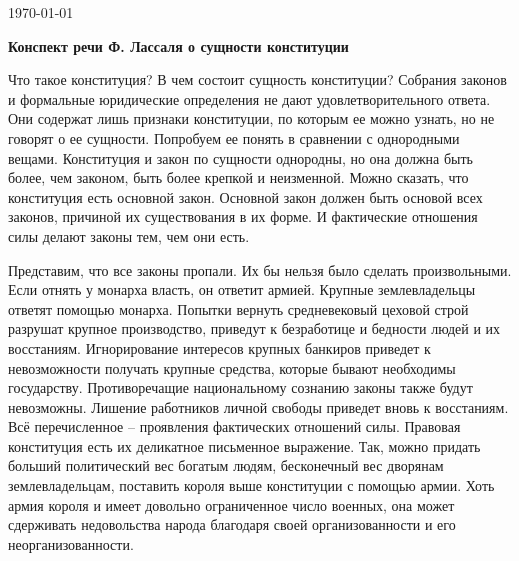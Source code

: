 \documentclass[a4paper, 12pt]{article}
\begin{document}
 \hfill {\today}

\begin{center}
\bf Конспект речи Ф. Лассаля о сущности конституции 
\end{center}

\def\paste{
Здесь текст, который должен занимать одну двадцатую часть страницы. Ровно столько я должен написать о каждой странице речи. Или чуть больше. 
}
Что такое конституция? В чем состоит сущность конституции? Собрания законов и формальные юридические определения не дают удовлетворительного ответа. 
Они содержат лишь признаки конституции, по которым ее можно узнать, но не говорят о ее сущности. Попробуем ее понять в сравнении с однородными вещами. 
Конституция и закон по сущности однородны, но она должна быть более, чем законом, быть более крепкой и неизменной. Можно сказать, что конституция есть основной закон. 
Основной закон должен быть основой всех законов, причиной их существования в их форме. И фактические отношения силы делают законы тем, чем они есть.

Представим, что все законы пропали. Их бы нельзя было сделать произвольными. Если отнять у монарха власть, он ответит армией. Крупные землевладельцы ответят помощью монарха. 
Попытки вернуть средневековый цеховой строй разрушат крупное производство, приведут к безработице и бедности людей и их восстаниям. 
Игнорирование интересов крупных банкиров приведет к невозможности получать крупные средства, которые бывают необходимы государству. Противоречащие национальному сознанию законы также будут невозможны. 
Лишение работников личной свободы приведет вновь к восстаниям. Всё перечисленное -- проявления фактических отношений силы. Правовая конституция есть их деликатное письменное выражение. 
Так, можно придать больший политический вес богатым людям, бесконечный вес дворянам землевладельцам, поставить короля выше конституции с помощью армии. 
Хоть армия короля и имеет довольно ограниченное число военных, она может сдерживать недовольства народа благодаря своей организованности и его неорганизованности. 
\end{document}
